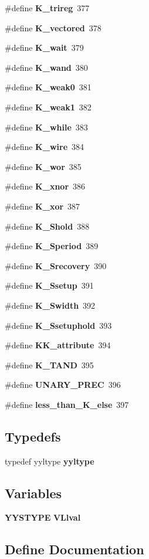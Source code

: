 \begin{CompactItemize}
\item 
\#define {\bf K\_\-trireg}\ 377
\item 
\#define {\bf K\_\-vectored}\ 378
\item 
\#define {\bf K\_\-wait}\ 379
\item 
\#define {\bf K\_\-wand}\ 380
\item 
\#define {\bf K\_\-weak0}\ 381
\item 
\#define {\bf K\_\-weak1}\ 382
\item 
\#define {\bf K\_\-while}\ 383
\item 
\#define {\bf K\_\-wire}\ 384
\item 
\#define {\bf K\_\-wor}\ 385
\item 
\#define {\bf K\_\-xnor}\ 386
\item 
\#define {\bf K\_\-xor}\ 387
\item 
\#define {\bf K\_\-Shold}\ 388
\item 
\#define {\bf K\_\-Speriod}\ 389
\item 
\#define {\bf K\_\-Srecovery}\ 390
\item 
\#define {\bf K\_\-Ssetup}\ 391
\item 
\#define {\bf K\_\-Swidth}\ 392
\item 
\#define {\bf K\_\-Ssetuphold}\ 393
\item 
\#define {\bf KK\_\-attribute}\ 394
\item 
\#define {\bf K\_\-TAND}\ 395
\item 
\#define {\bf UNARY\_\-PREC}\ 396
\item 
\#define {\bf less\_\-than\_\-K\_\-else}\ 397
\end{CompactItemize}
\subsection*{Typedefs}
\begin{CompactItemize}
\item 
typedef yyltype {\bf yyltype}
\end{CompactItemize}
\subsection*{Variables}
\begin{CompactItemize}
\item 
{\bf YYSTYPE} {\bf VLlval}
\end{CompactItemize}


\subsection{Define Documentation}
